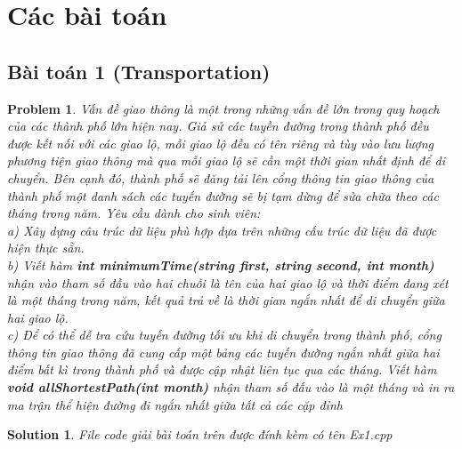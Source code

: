 \documentclass[a4paper]{article}
\newtheorem*{problem}{Problem}
\newtheorem*{sol}{Solution}
\begin{document}
\begin{center}
\end{center}
\section{Các bài toán}
    \subsection{Bài toán 1 (Transportation)}
    \begin{problem}
Vấn đề giao thông là một trong những vấn đề lớn trong quy hoạch của các thành phố lớn hiện nay. Giả sử các tuyền đường trong thành phố đều được kết nối với các giao lộ, mỗi giao lộ đều có tên riêng và tùy vào lưu lượng phương tiện giao thông mà qua mỗi giao lộ sẽ cần một thời gian nhất định để di chuyển. Bên cạnh đó, thành phố sẽ đăng tải lên cổng thông tin giao thông của thành phố một danh sách các tuyến đường sẽ bị tạm dừng để sửa chữa theo các tháng trong năm. Yêu cầu dành cho sinh viên: \\
a) Xây dựng câu trúc dữ liệu phù hợp dựa trên những cấu trúc dữ liệu đã được hiện thực sẵn. \\
b) Viết hàm \textbf{int minimumTime(string first, string second, int month)} nhận vào tham số đầu vào hai chuỗi là tên của hai giao lộ và thời điểm đang xét là một tháng trong năm, kết quả trả về là thời gian ngắn nhất để di chuyển giữa hai giao lộ. \\
c) Để có thể dễ tra cứu tuyến đường tối ưu khi di chuyển trong thành phố, cổng thông tin giao thông đã cung cấp một bảng các tuyến đường ngắn nhất giữa hai điểm bất kì trong thành phố và được cập nhật liên tục qua các tháng. Viết hàm \textbf{void allShortestPath(int month)} nhận tham số đấu vào là một tháng và in ra ma trận thể hiện đường đi ngắn nhất giữa tất cả các cặp đỉnh
    \end{problem}
    \begin{sol}
    File code giải bài toán trên được đính kèm có tên Ex1.cpp
 
    \end{sol}
\end{document}
